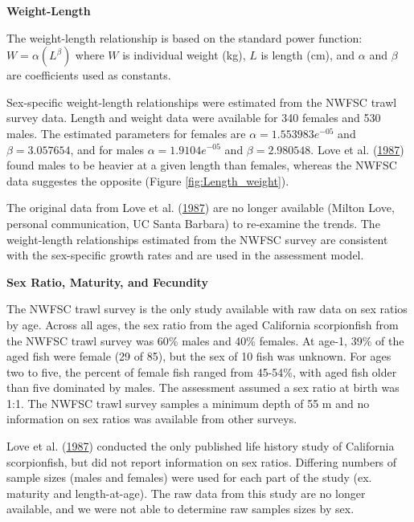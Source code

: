 \documentclass[12pt,]{article}
\begin{document}
\vspace{.5cm}

\textbf{Weight-Length}

The weight-length relationship is based on the standard power function:
\(W = \alpha(L^\beta)\) where \(W\) is individual weight (kg), \(L\) is
length (cm), and \(\alpha\) and \(\beta\) are coefficients used as
constants.

Sex-specific weight-length relationships were estimated from the NWFSC
trawl survey data. Length and weight data were available for 340 females
and 530 males. The estimated parameters for females are
\(\alpha = 1.553983e^{-05}\) and \(\beta = 3.057654\), and for males
\(\alpha = 1.9104e^{-05}\) and \(\beta = 2.980548\). Love et al.
(\protect\hyperlink{ref-Love1987}{1987}) found males to be heavier at a
given length than females, whereas the NWFSC data suggestes the opposite
(Figure \ref{fig:Length_weight}).

The original data from Love et al.
(\protect\hyperlink{ref-Love1987}{1987}) are no longer available (Milton
Love, personal communication, UC Santa Barbara) to re-examine the
trends. The weight-length relationships estimated from the NWFSC survey
are consistent with the sex-specific growth rates and are used in the
assessment model.

\vspace{.5cm}

\textbf{Sex Ratio, Maturity, and Fecundity}

The NWFSC trawl survey is the only study available with raw data on sex
ratios by age. Across all ages, the sex ratio from the aged California
scorpionfish from the NWFSC trawl survey was 60\% males and 40\%
females. At age-1, 39\% of the aged fish were female (29 of 85), but the
sex of 10 fish was unknown. For ages two to five, the percent of female
fish ranged from 45-54\%, with aged fish older than five dominated by
males. The assessment assumed a sex ratio at birth was 1:1. The NWFSC
trawl survey samples a minimum depth of 55 m and no information on sex
ratios was available from other surveys.

Love et al. (\protect\hyperlink{ref-Love1987}{1987}) conducted the only
published life history study of California scorpionfish, but did not
report information on sex ratios. Differing numbers of sample sizes
(males and females) were used for each part of the study (ex. maturity
and length-at-age). The raw data from this study are no longer
available, and we were not able to determine raw samples sizes by sex.
\end{document}
